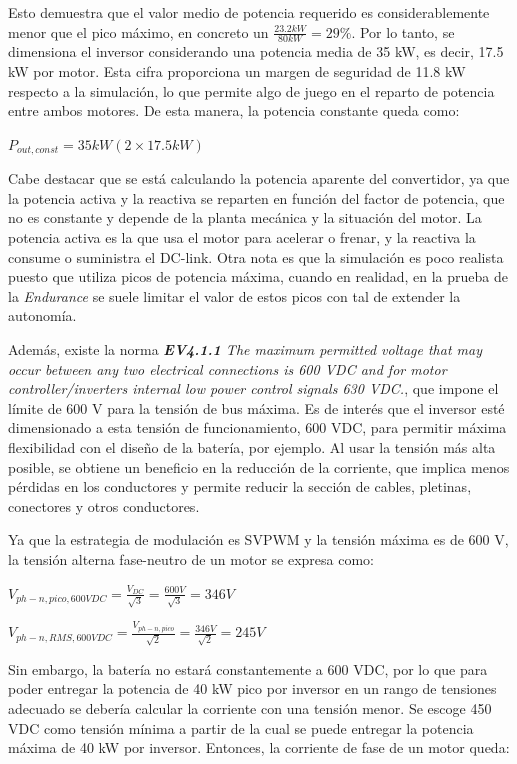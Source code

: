 Esto demuestra que el valor medio de potencia requerido es considerablemente menor que el pico máximo, en concreto un \(\frac{23.2 kW}{80 kW} = 29\%\). Por lo tanto, se dimensiona el inversor considerando una potencia media de 35 kW, es decir, 17.5 kW por motor. Esta cifra proporciona un margen de seguridad de 11.8 kW respecto a la simulación, lo que permite algo de juego en el reparto de potencia entre ambos motores. De esta manera, la potencia constante queda como:

\(P_{out, const} = 35 kW (2 \times 17.5 kW)\)

Cabe destacar que se está calculando la potencia aparente del convertidor, ya que la potencia activa y la reactiva se reparten en función del factor de potencia, que no es constante y depende de la planta mecánica y la situación del motor. La potencia activa es la que usa el motor para acelerar o frenar, y la reactiva la consume o suministra el DC-link. Otra nota es que la simulación es poco realista puesto que utiliza picos de potencia máxima, cuando en realidad, en la prueba de la \textit{Endurance} se suele limitar el valor de estos picos con tal de extender la autonomía.

Además, existe la norma \textit{\textbf{EV4.1.1} The maximum permitted voltage that may occur between any two electrical connections is 600 VDC and for motor controller/inverters internal low power control signals 630 VDC.}, que impone el límite de 600 V para la tensión de bus máxima. Es de interés que el inversor esté dimensionado a esta tensión de funcionamiento, 600 VDC, para permitir máxima flexibilidad con el diseño de la batería, por ejemplo. Al usar la tensión más alta posible, se obtiene un beneficio en la reducción de la corriente, que implica menos pérdidas en los conductores y permite reducir la sección de cables, pletinas, conectores y otros conductores.

Ya que la estrategia de modulación es SVPWM y la tensión máxima es de 600 V, la tensión alterna fase-neutro de un motor se expresa como:

\(V_{ph-n, pico, 600 VDC} = \frac{V_{DC}}{\sqrt{3}} = \frac{600 V}{\sqrt{3}} = 346 V\)

\(V_{ph-n, RMS, 600 VDC} = \frac{V_{ph-n, pico}}{\sqrt{2}} = \frac{346 V}{\sqrt{2}} = 245 V\)

Sin embargo, la batería no estará constantemente a 600 VDC, por lo que para poder entregar la potencia de 40 kW pico por inversor en un rango de tensiones adecuado se debería calcular la corriente con una tensión menor. Se escoge 450 VDC como tensión mínima a partir de la cual se puede entregar la potencia máxima de 40 kW por inversor. Entonces, la corriente de fase de un motor queda:


